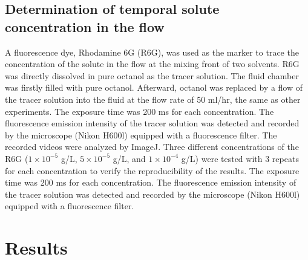 \documentclass[journal=langd5,manuscript=article]{achemso}
\begin{document}
\subsection{Determination of temporal solute concentration in the flow}
A fluorescence dye, Rhodamine 6G (R6G), was used as the marker to trace the concentration of the solute in the flow at the mixing front of two solvents. R6G was directly dissolved in pure octanol as the tracer solution. The fluid chamber was firstly filled with pure octanol. Afterward, octanol was replaced by a flow of the tracer solution into the fluid at the flow rate of 50 ml/hr, the same as other experiments. The exposure time was 200 ms for each concentration. The fluorescence emission intensity of the tracer solution was detected and recorded by the microscope (Nikon H600l) equipped with a fluorescence filter. The recorded videos were analyzed by ImageJ. Three different concentrations of the R6G ($1\times 10^{−5}$ g/L, $5\times 10^{−5}$ g/L, and $1\times 10^{−4}$ g/L) were tested with 3 repeats for each concentration to verify the reproducibility of the results. The exposure time was 200 ms for each concentration. The fluorescence emission intensity of the tracer solution was detected and recorded by the microscope (Nikon H600l) equipped with a fluorescence filter.


\section{Results}
\end{document}
